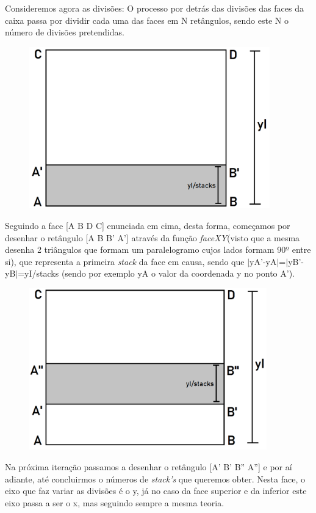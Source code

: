 \documentclass{article}
\begin{document}
Consideremos agora as divisões:
\newline
O processo por detrás das divisões das faces da caixa passa por dividir cada uma das faces em N retângulos, sendo este N o número de divisões pretendidas.

\begin{figure}[H]
\centering
\includegraphics[height=7cm]{caixaStacks1.png}
\end{figure}

Seguindo a face [A B D C] enunciada em cima, desta forma, começamos por desenhar o retângulo [A B B' A'] através da função \textit{faceXY}(visto que a mesma desenha 2 triângulos que formam um paralelogramo cujos lados formam 90º entre si), que representa a primeira \textit{stack} da face em causa, sendo que $|$yA'-yA$|$=$|$yB'-yB$|$=yI/stacks (sendo por exemplo yA o valor da coordenada y no ponto A').

\begin{figure}[H]
\centering
\includegraphics[height=7cm]{caixaStacks2.png}
\end{figure}

Na próxima iteração passamos a desenhar o retângulo [A' B' B'' A''] e por aí adiante, até concluirmos o números de \textit{stack's} que queremos obter.
\newline
Nesta face, o eixo que faz variar as divisões é o y, já no caso da face superior e da inferior este eixo passa a ser o x, mas seguindo sempre a mesma teoria.
\end{document}
